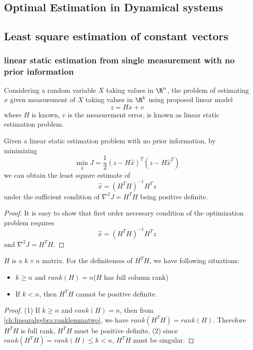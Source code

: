\begin{refsection}

\chapter{Optimal Estimation in Dynamical systems}\label{ch:estimation-in-dynamical-systems}
\minitoc
\section{Least square estimation of constant vectors}
\subsection{linear static estimation from single measurement with no prior information}
\begin{definition}
Considering a random variable $X$ taking values in $\R^n$, the problem of estimating $x$ given measurement of $X$ taking values in $\R^k$ using proposed linear model
$$z = Hx + v$$
where $H$ is known, $v$ is the measurement error, is known as linear static estimation problem.
\end{definition}

\begin{theorem}\cite[302]{stengel2012optimal}
Given a linear static estimation problem with no prior information, by minimizing
$$\min_{\hat{x}} J = \frac{1}{2}(z - H\hat{x})^T(z - H\hat{x}^T)$$
we can obtain the least square estimate of
$$\hat{x} = (H^TH)^{-1}H^Tz$$
under the sufficient condition of $\nabla^2 J = H^TH$ being positive definite.	
\end{theorem}
\begin{proof}
It is easy to show that first order necessary condition of the optimization problem requires
$$\hat{x} = (H^TH)^{-1}H^Tz$$ and $\nabla^2 J = H^TH$.
\end{proof}

\begin{lemma}
$H$ is a $k\times n$ matrix. For the definiteness of $H^TH$, we have following situations:
\begin{itemize}
	\item $k \geq n$ and $rank(H) = n$($H$ has full column rank)
	\item If $k < n$,  then $H^TH$ cannot be positive definite.
\end{itemize}
\end{lemma}
\begin{proof}
(1) If $k \geq n$ and $rank(H) = n$, then from \autoref{ch:linearalgebra:ranklemmatwo}, we have $rank(H^TH) = rank(H)$. Therefore $H^TH$ is full rank, $H^TH$ must be positive definite.
(2) since $rank(H^TH) = rank(H) \leq k < n$, $H^TH$ must be singular. 
\end{proof}


\end{refsection}
